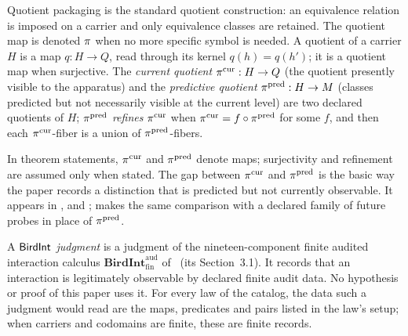 \begin{definition}\label{def:quotient-packaging}
Quotient packaging is the standard quotient construction: an
equivalence relation is imposed on a carrier and only equivalence
classes are retained.  The quotient map is denoted \(\pi\) when no
more specific symbol is needed.  A quotient of a
carrier \(H\) is a map \(q:H\to Q\), read through its kernel \(q(h)=q(h')\); it
is a quotient map when surjective. The \emph{current quotient}
\(\pi^{\mathrm{cur}}:H\to Q\) (the quotient presently visible to the apparatus) and the
\emph{predictive quotient} \(\pi^{\mathrm{pred}}:H\to M\) (classes predicted but not
necessarily visible at the current level) are two declared quotients of \(H\);
\(\pi^{\mathrm{pred}}\) \emph{refines} \(\pi^{\mathrm{cur}}\) when \(\pi^{\mathrm{cur}}=f\circ\pi^{\mathrm{pred}}\) for some \(f\),
and then each \(\pi^{\mathrm{cur}}\)-fiber is a union of \(\pi^{\mathrm{pred}}\)-fibers.
\end{definition}

In theorem statements, \(\pi^{\mathrm{cur}}\) and \(\pi^{\mathrm{pred}}\) denote maps; surjectivity
and refinement are assumed only when stated.  The gap between \(\pi^{\mathrm{cur}}\)
and \(\pi^{\mathrm{pred}}\) is the basic way the paper records a distinction that is
predicted but not currently observable.  It appears in ,
 and ;  makes the same comparison with a
declared family of future probes in place of \(\pi^{\mathrm{pred}}\).

\begin{definition}\label{def:birdint}
A \emph{\(\mathsf{BirdInt}\) judgment} is a judgment of the nineteen-component finite
audited interaction calculus \(\mathbf{BirdInt}^{\mathrm{aud}}_{\mathrm{fin}}\)
of \FoundIII\ (its Section~3.1).  It records that an interaction is
legitimately observable by declared finite audit data.  No hypothesis or
proof of this paper uses it.  For every law of the catalog, the data
such a judgment would read are the maps, predicates and pairs listed in
the law's setup; when carriers and codomains are finite, these are
finite records.
\end{definition}

